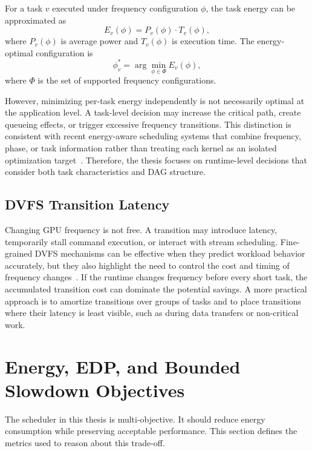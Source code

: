 For a task $v$ executed under frequency configuration $\phi$, the task energy can be approximated as
\begin{equation}
E_v(\phi) = P_v(\phi) \cdot T_v(\phi),
\label{eq:task_energy}
\end{equation}
where $P_v(\phi)$ is average power and $T_v(\phi)$ is execution time. The energy-optimal configuration is
\begin{equation}
\phi_v^{*} = \arg\min_{\phi \in \Phi} E_v(\phi),
\label{eq:energy_optimal_frequency}
\end{equation}
where $\Phi$ is the set of supported frequency configurations.

However, minimizing per-task energy independently is not necessarily optimal at the application level. A task-level decision may increase the critical path, create queueing effects, or trigger excessive frequency transitions. This distinction is consistent with recent energy-aware scheduling systems that combine frequency, phase, or task information rather than treating each kernel as an isolated optimization target~\cite{Chen2023JOSS,Chen2024SWEEP,Fan2023Synergy,Carpentieri2025Phase}. Therefore, the thesis focuses on runtime-level decisions that consider both task characteristics and DAG structure.

\subsection{DVFS Transition Latency}
\label{subsec:dvfs_transition_latency}

Changing GPU frequency is not free. A transition may introduce latency, temporarily stall command execution, or interact with stream scheduling. Fine-grained DVFS mechanisms can be effective when they predict workload behavior accurately, but they also highlight the need to control the cost and timing of frequency changes~\cite{Bharadwaj2023Predict}. If the runtime changes frequency before every short task, the accumulated transition cost can dominate the potential savings. A more practical approach is to amortize transitions over groups of tasks and to place transitions where their latency is least visible, such as during data transfers or non-critical work.

\section{Energy, EDP, and Bounded Slowdown Objectives}
\label{sec:theory_metrics}

The scheduler in this thesis is multi-objective. It should reduce energy consumption while preserving acceptable performance. This section defines the metrics used to reason about this trade-off.

